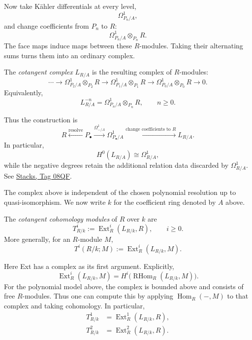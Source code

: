 \noindent
Now take K\"ahler differentials at every
level,
$$
\Omega^1_{P_n/A},
$$
and change coefficients from $P_n$ to $R$:
$$
\Omega^1_{P_n/A}\otimes_{P_n}R.
$$
The face maps induce maps between these
$R$-modules. Taking their alternating sums
turns them into an ordinary complex.

\begin{definition}
\label{definition-cotangent-complex-primer}
The \emph{cotangent complex} $L_{R/A}$ is
the resulting complex of $R$-modules:
$$
\cdots\longrightarrow
\Omega^1_{P_2/A}\otimes_{P_2}R
\longrightarrow
\Omega^1_{P_1/A}\otimes_{P_1}R
\longrightarrow
\Omega^1_{P_0/A}\otimes_{P_0}R
\longrightarrow0.
$$
Equivalently,
$$
L^{-n}_{R/A}=\Omega^1_{P_n/A}\otimes_{P_n}R,
\qquad n\geq0.
$$
\end{definition}

\noindent
Thus the construction is
$$
R\xleftarrow{\text{resolve}}P_\bullet
\xrightarrow{\Omega^1_{-/A}}\Omega^1_{P_\bullet/A}
\xrightarrow{\text{change coefficients to }R}L_{R/A}.
$$
In particular,
$$
H^0(L_{R/A})\cong\Omega^1_{R/A},
$$
while the negative degrees retain the
additional relation data discarded by
$\Omega^1_{R/A}$. See
\href{https://stacks.math.columbia.edu/%
tag/08QF}{Stacks, Tag 08QF}.


\medskip\noindent
The complex above is independent of the
chosen polynomial resolution up to
quasi-isomorphism. We now write $k$ for
the coefficient ring denoted by $A$ above.

\begin{definition}
\label{definition-cotangent-modules}
The \emph{cotangent cohomology modules}
of $R$ over $k$ are
$$
T^i_{R/k}
:=
\operatorname{Ext}^i_R(L_{R/k},R),
\qquad i\geq0.
$$
More generally, for an $R$-module $M$,
$$
T^i(R/k;M)
:=
\operatorname{Ext}^i_R(L_{R/k},M).
$$
\end{definition}

\noindent
Here Ext has a complex as its first
argument. Explicitly,
$$
\operatorname{Ext}^i_R(L_{R/k},M)
=
H^i\bigl(
\operatorname{RHom}_R(L_{R/k},M)
\bigr).
$$
For the polynomial model above, the
complex is bounded above and consists of
free $R$-modules. Thus one can compute
this by applying
$\operatorname{Hom}_R(-,M)$
to that complex and taking cohomology.
In particular,
$$
\begin{aligned}
T^1_{R/k}
&=\operatorname{Ext}^1_R(L_{R/k},R),\\
T^2_{R/k}
&=\operatorname{Ext}^2_R(L_{R/k},R).
\end{aligned}
$$

